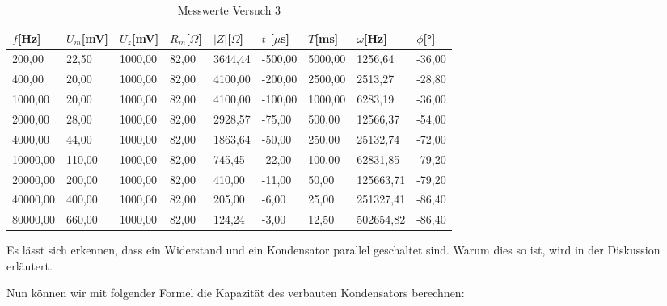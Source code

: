         \begin{table}[H]
            \centering
            \caption{Messwerte Versuch 3}
            \vspace{0.5em}
            \begin{tabular}{|l||l|l|l|l|l|l|l|l|}
                \hline
                $f$[Hz] & $U_m$[mV]  & $U_z$[mV] & $R_{m}$[$\Omega$] & $|Z|$[$\Omega$] & $t$ [$\mu$s] & $T$[ms] & $\omega$[Hz] & $\phi$[°] \\
                \hline
                \hline
                200,00   & 22,50  & 1000,00 & 82,00 & 3644,44 & -500,00 & 5000,00 & 1256,64   & -36,00 \\
                \hline
                400,00   & 20,00  & 1000,00 & 82,00 & 4100,00 & -200,00 & 2500,00 & 2513,27   & -28,80 \\
                \hline
                1000,00  & 20,00  & 1000,00 & 82,00 & 4100,00 & -100,00 & 1000,00 & 6283,19   & -36,00 \\
                \hline
                2000,00  & 28,00  & 1000,00 & 82,00 & 2928,57 & -75,00  & 500,00  & 12566,37  & -54,00 \\
                \hline
                4000,00  & 44,00  & 1000,00 & 82,00 & 1863,64 & -50,00  & 250,00  & 25132,74  & -72,00 \\
                \hline
                10000,00 & 110,00 & 1000,00 & 82,00 & 745,45  & -22,00  & 100,00  & 62831,85  & -79,20 \\
                \hline
                20000,00 & 200,00 & 1000,00 & 82,00 & 410,00  & -11,00  & 50,00   & 125663,71 & -79,20 \\
                \hline
                40000,00 & 400,00 & 1000,00 & 82,00 & 205,00  & -6,00   & 25,00   & 251327,41 & -86,40 \\
                \hline
                80000,00 & 660,00 & 1000,00 & 82,00 & 124,24  & -3,00   & 12,50   & 502654,82 & -86,40\\
                \hline
            \end{tabular}
            \label{tab:Versuch3_Messwerte}
        \end{table}

        \noindent Es lässt sich erkennen, dass ein Widerstand und ein Kondensator parallel geschaltet sind. Warum dies so ist, wird in der Diskussion erläutert.

        \noindent Nun können wir mit folgender Formel die Kapazität des verbauten Kondensators berechnen:

